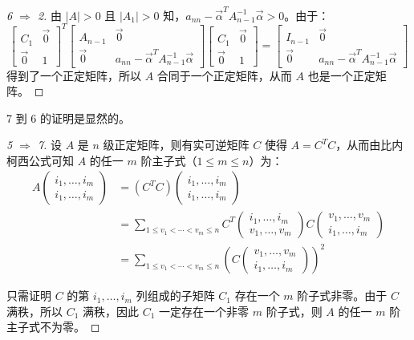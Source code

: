 \begin{proof}[6 $\Longrightarrow$ 2]
	由 $|A| > 0$ 且 $|A_1| > 0$ 知，$a_{nn} - \vec \alpha^T A_{n - 1}^{-1} \vec \alpha > 0$。由于：
	$$
	\begin{bmatrix} C_1 & \vec 0 \\ \vec 0 & 1\end{bmatrix}^T
	\begin{bmatrix} A_{n - 1} & \vec 0 \\ \vec 0 & a_{nn} - \vec \alpha^T A_{n - 1}^{-1} \vec \alpha \end{bmatrix}
	\begin{bmatrix} C_1 & \vec 0 \\ \vec 0 & 1 \end{bmatrix}
	=
	\begin{bmatrix} I_{n - 1} & \vec 0 \\ \vec 0 & a_{nn} - \vec \alpha^T A_{n - 1} ^{-1} \vec \alpha \end{bmatrix}
	$$
	得到了一个正定矩阵，所以 $A$ 合同于一个正定矩阵，从而 $A$ 也是一个正定矩阵。
\end{proof}

7 到 6 的证明是显然的。

\begin{proof}[5 $\Longrightarrow$ 7]
	设 $A$ 是 $n$ 级正定矩阵，则有实可逆矩阵 $C$ 使得 $A = C^T C$，从而由比内柯西公式可知 $A$ 的任一 $m$ 阶主子式（$1 \le m \le n$）为：
	$$
	\begin{aligned}
		A \begin{pmatrix} i_1, \ldots, i_m \\ i_1, \ldots, i_m \end{pmatrix}   &= (C^T C) \begin{pmatrix} i_1, \ldots, i_m \\ i_1, \ldots, i_m \end{pmatrix}
		\\&=
		\sum\limits_{1 \le v_1 < \cdots < v_m \le n} C^T \begin{pmatrix} i_1, \ldots, i_m \\ v_1, \ldots, v_m \end{pmatrix} C \begin{pmatrix} v_1, \ldots, v_m \\ i_1, \ldots, i_m \end{pmatrix}
		\\&=
		\sum\limits_{1 \le v_1 < \cdots < v_m \le n} \left( C \begin{pmatrix} v_1, \ldots, v_m \\ i_1, \ldots, i_m \end{pmatrix} \right)^2
	\end{aligned}
	$$

	只需证明 $C$ 的第 $i_1, \ldots, i_m$ 列组成的子矩阵 $C_1$ 存在一个 $m$ 阶子式非零。由于 $C$ 满秩，所以 $C_1$ 满秩，因此 $C_1$ 一定存在一个非零 $m$ 阶子式，则 $A$ 的任一 $m$ 阶主子式不为零。
\end{proof}

